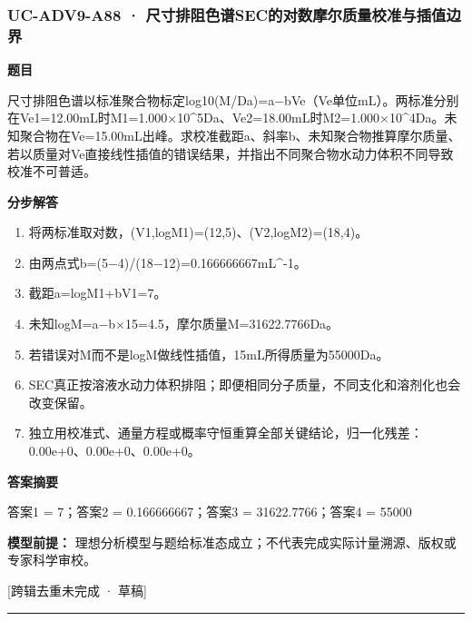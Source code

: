 \documentclass[UTF8,11pt,a4paper]{ctexart}
\begin{document}
\subsubsection*{UC-ADV9-A88 · 尺寸排阻色谱SEC的对数摩尔质量校准与插值边界}
\noindent\textbf{题目}\par
尺寸排阻色谱以标准聚合物标定log10(M/Da)=a−bVe（Ve单位mL）。两标准分别在Ve1=12.00mL时M1=1.000×10\textasciicircum{}5Da、Ve2=18.00mL时M2=1.000×10\textasciicircum{}4Da。未知聚合物在Ve=15.00mL出峰。求校准截距a、斜率b、未知聚合物推算摩尔质量、若以质量对Ve直接线性插值的错误结果，并指出不同聚合物水动力体积不同导致校准不可普适。\par
\medskip\noindent\textbf{分步解答}
\begin{enumerate}
\item 将两标准取对数，(V1,logM1)=(12,5)、(V2,logM2)=(18,4)。
\item 由两点式b=(5−4)/(18−12)=0.166666667mL\textasciicircum{}-1。
\item 截距a=logM1+bV1=7。
\item 未知logM=a−b×15=4.5，摩尔质量M=31622.7766Da。
\item 若错误对M而不是logM做线性插值，15mL所得质量为55000Da。
\item SEC真正按溶液水动力体积排阻；即便相同分子质量，不同支化和溶剂化也会改变保留。
\item 独立用校准式、通量方程或概率守恒重算全部关键结论，归一化残差：0.00e+0、0.00e+0、0.00e+0。
\end{enumerate}
\noindent\textbf{答案摘要}\par
答案1 = 7；答案2 = 0.166666667；答案3 = 31622.7766；答案4 = 55000\par
\noindent\textbf{模型前提：}
理想分析模型与题给标准态成立；不代表完成实际计量溯源、版权或专家科学审校。\par
\noindent\textcolor{red!65!black}{[跨辑去重未完成 · 草稿]} \par
\medskip\hrule\medskip
{}
\end{document}
